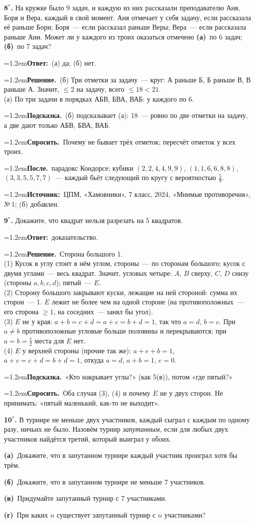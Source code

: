 \documentclass[10pt,a4paper]{article}
\newcommand{\usl}[1]{\par\vspace{7pt}\noindent\colorbox{black!7}{\parbox{\dimexpr\linewidth-2\fboxsep}{#1}}\par\vspace{2pt}}
\newcommand{\pole}[2]{\par\noindent\hangindent=1.2em\textbf{#1}\ #2\par}
\begin{document}
\usl{\textbf{8$^*$.} На кружке было 9 задач, и каждую из них рассказали преподавателю Аня, Боря и Вера,
каждый в свой момент. Аня отмечает у себя задачу, если рассказала её раньше Бори; Боря~--- если рассказал раньше Веры;
Вера~--- если рассказала раньше Ани. Может ли у каждого из троих оказаться отмечено \textbf{(а)}~по 6 задач; \textbf{(б)}~по 7 задач?}
\pole{Ответ:}{(а) да; (б) нет.}
\pole{Решение.}{(б) Три отметки за задачу~--- круг: А раньше Б, Б раньше В, В раньше А. Значит, $\le2$ на задачу, всего $\le18<21$.\\ (а) По три задачи в порядках АБВ, БВА, ВАБ: у каждого по 6.}
\pole{Подсказка.}{(б) подсказывает (а): 18~--- ровно по две отметки на задачу, а две дают только АБВ, БВА, ВАБ.}
\pole{Спросить.}{Почему не бывает трёх отметок; пересчёт отметок у всех троих.}
\pole{После.}{парадокс Кондорсе; кубики $(2,2,4,4,9,9)$, $(1,1,6,6,8,8)$, $(3,3,5,5,7,7)$~--- каждый бьёт следующий по кругу с вероятностью $\tfrac59$.}
{\small\pole{Источник:}{ЦПМ, «Хамовники», 7 класс, 2024, «Мнимые противоречия», №\,1; (б) добавлен.}}
\usl{\textbf{9$^*$.} Докажите, что квадрат нельзя разрезать на 5 квадратов.}
\pole{Ответ:}{доказательство.}
\pole{Решение.}{Сторона большого 1.\\ (1) Кусок в углу стоит в нём углом, стороны~--- по сторонам большого; кусок с двумя углами~--- весь квадрат. Значит, угловых четыре: $A$, $B$ сверху, $C$, $D$ снизу (стороны $a,b,c,d$); пятый~--- $E$.\\ (2) Сторону большого закрывают куски, лежащие на ней стороной: сумма их сторон~--- 1. $E$ лежит не более чем на одной стороне (на противоположных~--- его сторона $\ge1$, на соседних~--- занял бы угол).\\ (3) $E$ не у края: $a+b=c+d=a+c=b+d=1$, так что $a=d$, $b=c$. При $a\ne b$ противоположные угловые больше половины и перекрываются; при $a=b=\tfrac12$ места для $E$ нет.\\ (4) $E$ у верхней стороны (прочие так же): $a+e+b=1$, $a+c=c+d=b+d=1$, откуда $a=d$, $a+b=1$, $e=0$.}
\pole{Подсказка.}{«Кто накрывает углы?» (как 5(в)), потом «где пятый?»}
\pole{Спросить.}{Оба случая (3), (4) и почему $E$ не у двух сторон. Не принимать: «пятый маленький, как-то не выходит».}
\usl{\textbf{10$^*$.} В турнире не меньше двух участников, каждый сыграл с каждым по одному разу, ничьих не было. Назовём турнир
\textit{запутанным}, если для любых двух участников найдётся третий, который выиграл у обоих.\par
\textbf{(а)}~Докажите, что в запутанном турнире каждый участник проиграл хотя бы трём.\par
\textbf{(б)}~Докажите, что в запутанном турнире не меньше 7 участников.\par
\textbf{(в)}~Придумайте запутанный турнир с 7 участниками.\par
\textbf{(г)}~При каких $n$ существует запутанный турнир с $n$ участниками?}
\end{document}
